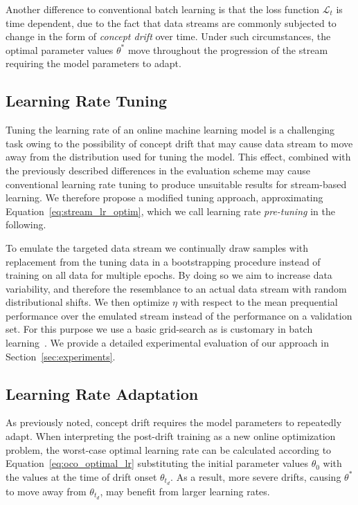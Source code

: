 \documentclass[runningheads]{llncs}
\begin{document}
Another difference to conventional batch learning is that the loss function $\mathcal{L}_t$ is time dependent, due to the fact that data streams are commonly subjected to change in the form of \textit{concept drift} over time.
Under such circumstances, the optimal parameter values $\theta^*$ move throughout the progression of the stream requiring the model parameters to adapt.

\subsection{Learning Rate Tuning}\label{subsec:pre-tuning}

Tuning the learning rate of an online machine learning model is a challenging task owing to the possibility of concept drift that may cause data stream to move away from the distribution used for tuning the model.
This effect, combined with the previously described differences in the evaluation scheme may cause conventional learning rate tuning to produce unsuitable results for stream-based learning.
We therefore propose a modified tuning approach, approximating Equation~\eqref{eq:stream_lr_optim}, which we call learning rate \textit{pre-tuning} in the following.

To emulate
the targeted data stream we continually draw samples with replacement from the tuning data in a bootstrapping procedure instead of training on all data for multiple epochs.
By doing so we aim to increase data variability, and therefore the resemblance to an actual data stream with random distributional shifts.
We then optimize $\eta$ with respect to the mean prequential performance over the emulated stream instead of the performance on a validation set.
For this purpose we use a basic grid-search as is customary in batch learning~\cite{defazioLearningRateFreeLearningDAdaptation2023a}.
We provide a detailed experimental evaluation of our approach in Section~\ref{sec:experiments}.

\subsection{Learning Rate Adaptation}

As previously noted, concept drift requires the model parameters to repeatedly adapt.
When interpreting the post-drift training as a new online optimization problem, the worst-case optimal learning rate can be calculated according to Equation~\ref{eq:oco_optimal_lr} substituting the initial parameter values $\theta_0$ with the values at the time of drift onset $\theta_{t_d}$.
As a result, more severe drifts, causing $\theta^*$ to move away from $\theta_{t_d}$, may benefit from larger learning rates.
\end{document}
